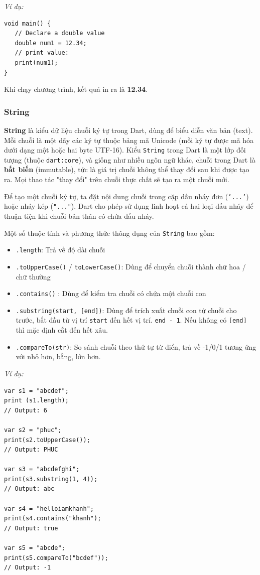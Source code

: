 \documentclass[../DoAn.tex]{subfiles}
\numberwithin{figure}{chapter}
\begin{document}
\textit{Ví dụ:}
\begin{lstlisting}
void main() {
   // Declare a double value
   double num1 = 12.34;             
   // print value:
   print(num1);
}
\end{lstlisting}

Khi chạy chương trình, kết quả in ra là \textbf{12.34}.
\subsubsection{String} 

\textbf{String} là kiểu dữ liệu chuỗi ký tự trong Dart, dùng để biểu diễn văn bản (text). Mỗi chuỗi là một dãy các ký tự thuộc bảng mã Unicode (mỗi ký tự được mã hóa dưới dạng một hoặc hai byte UTF-16). Kiểu \texttt{String} trong Dart là một lớp đối tượng (thuộc \texttt{dart:core}), và giống như nhiều ngôn ngữ khác, chuỗi trong Dart là \textbf{bất biến} (immutable), tức là giá trị chuỗi không thể thay đổi sau khi được tạo ra. Mọi thao tác "thay đổi" trên chuỗi thực chất sẽ tạo ra một chuỗi mới. 

Để tạo một chuỗi ký tự, ta đặt nội dung chuỗi trong cặp dấu nháy đơn (\texttt{'...'}) hoặc nháy kép (\texttt{"..."}). Dart cho phép sử dụng linh hoạt cả hai loại dấu nháy để thuận tiện khi chuỗi bản thân có chứa dấu nháy. 

Một số thuộc tính và phương thức thông dụng của \texttt{String} bao gồm:
\begin{itemize}
\item \texttt{.length}: Trả về độ dài chuỗi
\item \texttt{.toUpperCase()} / \texttt{toLowerCase()}: Dùng để chuyển chuỗi thành chữ hoa / chữ thường
\item \texttt{.contains()} : Dùng để kiểm tra chuỗi có chứa một chuỗi con
\item \texttt{.substring(start, [end])}: Dùng để trích xuất chuỗi con từ chuỗi cho trước, bắt đầu từ vị trí \texttt{start} đến hết vị trí.  \texttt{end - 1}. Nếu không có \texttt{[end]} thì mặc định cắt đến hết xâu.
\item \texttt{.compareTo(str)}: So sánh chuỗi theo thứ tự từ điển, trả về -1/0/1 tương ứng với nhỏ hơn, bằng, lớn hơn.
\end{itemize}

\textit{Ví dụ:} 
\begin{lstlisting}
var s1 = "abcdef"; 
print (s1.length);
// Output: 6

var s2 = "phuc";
print(s2.toUpperCase()); 
// Output: PHUC

var s3 = "abcdefghi";
print(s3.substring(1, 4));
// Output: abc

var s4 = "helloiamkhanh";
print(s4.contains("khanh");
// Output: true

var s5 = "abcde";
print(s5.compareTo("bcdef"));
// Output: -1
\end{lstlisting}
\end{document}
